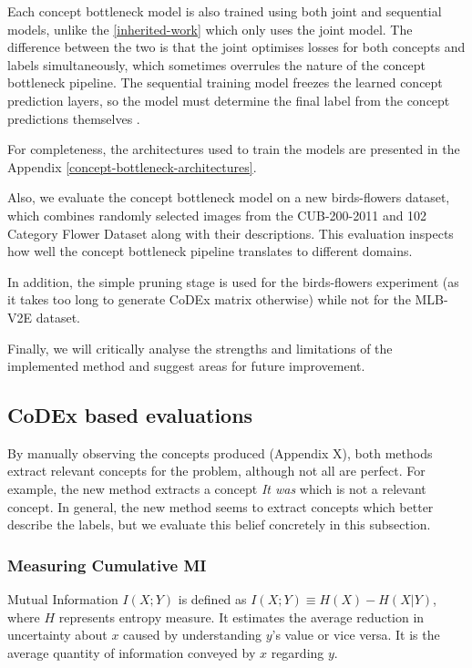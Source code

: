 Each concept bottleneck model is also trained using both joint and sequential models, unlike the \ref{inherited-work} which only uses the joint model.
The difference between the two is that the joint optimises losses for both concepts and labels simultaneously, which sometimes overrules the nature of the concept bottleneck pipeline.
The sequential training model freezes the learned concept prediction layers, so the model must determine the final label from the concept predictions themselves \cite{RefWorks:RefID:68-margeloiu2021concept}.

For completeness, the architectures used to train the models are presented in the Appendix \ref{concept-bottleneck-architectures}.

Also, we evaluate the concept bottleneck model on a new birds-flowers dataset, which combines randomly selected images from the CUB-200-2011 \cite{RefWorks:RefID:69-wah2011caltech-ucsd} and 102 Category Flower Dataset \cite{RefWorks:RefID:70-nilsback2008automated} along with their descriptions.
This evaluation inspects how well the concept bottleneck pipeline translates to different domains.

In addition, the simple pruning stage is used for the birds-flowers experiment (as it takes too long to generate CoDEx matrix otherwise) while not for the MLB-V2E dataset.

Finally, we will critically analyse the strengths and limitations of the implemented method and suggest areas for future improvement.

\subsection{CoDEx based evaluations}

By manually observing the concepts produced (Appendix X), both methods extract relevant concepts for the problem, although not all are perfect.
For example, the new method extracts a concept \emph{It was} which is not a relevant concept.
In general, the new method seems to extract concepts which better describe the labels, but we evaluate this belief concretely in this subsection.


\subsubsection{Measuring Cumulative MI}

Mutual Information $I(X;Y)$ \cite{RefWorks:RefID:30-mackay2004information} is defined as $I(X; Y) \equiv H(X) - H(X|Y)$, where $H$ represents entropy measure. 
It estimates the average reduction in uncertainty about $x$ caused by understanding $y$'s value or vice versa. 
It is the average quantity of information conveyed by $x$ regarding $y$.

